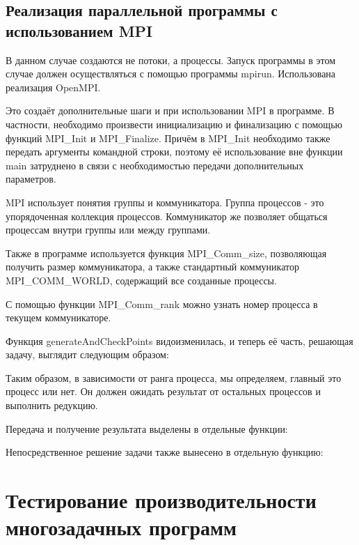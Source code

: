 \subsection{Реализация параллельной программы с использованием MPI}

В данном случае создаются не потоки, а процессы. Запуск программы в этом случае должен осуществляться с помощью программы mpirun. Использована реализация OpenMPI.

Это создаёт дополнительные шаги и при использовании MPI в программе. В частности, необходимо произвести инициализацию и финализацию с помощью функций MPI\_Init и MPI\_Finalize. Причём в MPI\_Init необходимо также передать аргументы командной строки, поэтому её использование вне функции main затруднено в связи с необходимостью передачи дополнительных параметров.

MPI использует понятия группы и коммуникатора. Группа процессов - это упорядоченная коллекция процессов. Коммуникатор же позволяет общаться процессам внутри группы или между группами.

Также в программе используется функция MPI\_Comm\_size, позволяющая получить размер коммуникатора, а также стандартный коммуникатор MPI\_COMM\_WORLD, содержащий все созданные процессы.

С помощью функции MPI\_Comm\_rank можно узнать номер процесса в текущем коммуникаторе.

Функция generateAndCheckPoints видоизменилась, и теперь её часть, решающая задачу, выглядит следующим образом:



Таким образом, в зависимости от ранга процесса, мы определяем, главный это процесс или нет. Он должен ожидать результат от остальных процессов и выполнить редукцию.

Передача и получение результата выделены в отдельные функции:



Непосредственное решение задачи также вынесено в отдельную функцию:




\section{Тестирование производительности многозадачных программ}

